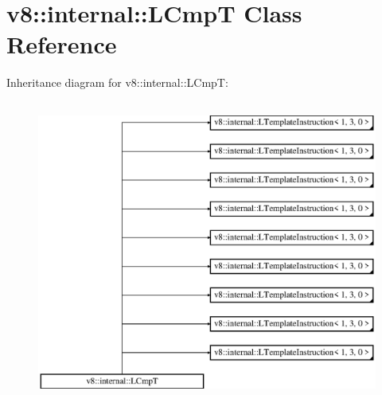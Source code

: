 \hypertarget{classv8_1_1internal_1_1_l_cmp_t}{}\section{v8\+:\+:internal\+:\+:L\+CmpT Class Reference}
\label{classv8_1_1internal_1_1_l_cmp_t}
Inheritance diagram for v8\+:\+:internal\+:\+:L\+CmpT\+:\begin{figure}[H]
\begin{center}
\leavevmode
\includegraphics[height=10.000000cm]{classv8_1_1internal_1_1_l_cmp_t}
\end{center}
\end{figure}
